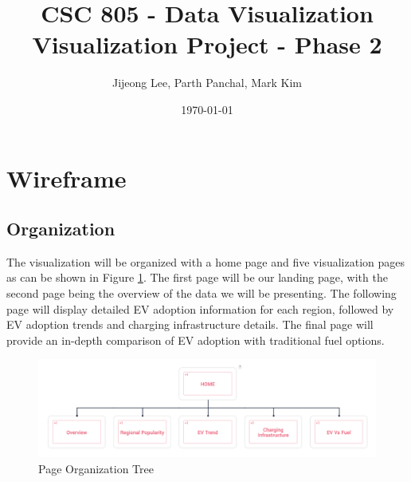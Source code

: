 \documentclass{article}
\title{CSC 805 - Data Visualization\\\large Visualization Project - Phase 2}
\author{Jijeong Lee, Parth Panchal, Mark Kim}
\date{\today}
\begin{document}
\clearpage\maketitle
\tableofcontents
\thispagestyle{empty}

\newpage
\section{Wireframe}

\subsection{Organization}
The visualization will be organized with a home page and five visualization
pages as can be shown in Figure \ref{fig:tree}.  The first page will be our
landing page, with the second page being the overview of the data we will be
presenting. The following page will display detailed EV adoption information for
each region, followed by EV adoption trends and charging infrastructure details. The final
page will provide an in-depth comparison of EV adoption with traditional fuel
options.
\begin{figure}[ht]
    \centering
    \includegraphics[scale=0.5]{Tree.png}
    \caption{Page Organization Tree}
    \label{fig:tree}
\end{figure}

\end{document}
